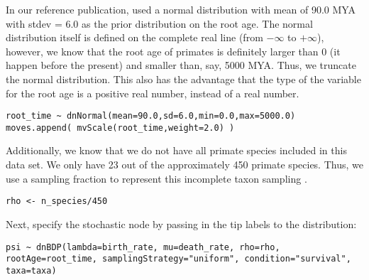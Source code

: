 In our reference publication, \cite{Perelman2011} used a normal distribution with mean of 90.0 MYA with stdev = 6.0 as the prior distribution on the root age.
The normal distribution itself is defined on the complete real line (\IE from $-\infty$ to $+\infty$), however, we know that the root age of primates is definitely larger than 0 (it happen before the present) and smaller than, say, 5000 MYA.
Thus, we truncate the normal distribution.
This also has the advantage that the type of the variable for the root age is a positive real number, instead of a real number.
{\tt \begin{snugshade*}
\begin{lstlisting}
root_time ~ dnNormal(mean=90.0,sd=6.0,min=0.0,max=5000.0)
moves.append( mvScale(root_time,weight=2.0) )
\end{lstlisting}
\end{snugshade*}}

Additionally, we know that we do not have all primate species included in this data set.
We only have 23 out of the approximately 450 primate species.
Thus, we use a sampling fraction to represent this incomplete taxon sampling \citep{Hoehna2011,Hoehna2014a}.
{\tt \begin{snugshade*}
\begin{lstlisting}
rho <- n_species/450
\end{lstlisting}
\end{snugshade*}}

Next, specify the  stochastic node by passing in the tip labels  to the  distribution:
{\tt \begin{snugshade*}
\begin{lstlisting}
psi ~ dnBDP(lambda=birth_rate, mu=death_rate, rho=rho, rootAge=root_time, samplingStrategy="uniform", condition="survival", taxa=taxa)
\end{lstlisting}
\end{snugshade*}}

